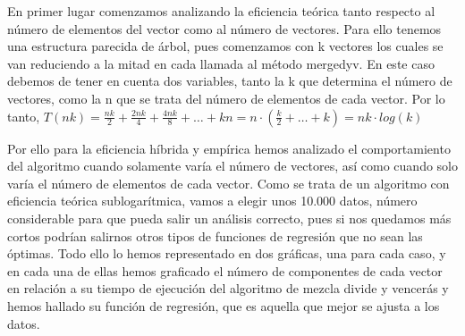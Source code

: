 En primer lugar comenzamos analizando la eficiencia teórica tanto respecto al número de elementos del vector como al número de vectores.
Para ello tenemos una estructura parecida de árbol, pues comenzamos con k vectores los cuales se van reduciendo a la mitad en cada llamada al método mergedyv.
En este caso debemos de tener en cuenta dos variables, tanto la k que determina el número de vectores, como la n que se trata del número de elementos de cada vector.
Por lo tanto, $T(nk) = \frac{nk}{2} + \frac{2nk}{4} + \frac{4nk}{8} + \dots + kn = n \cdot (\frac{k}{2} +\dots +k)= nk \cdot log(k) $

Por ello para la eficiencia híbrida y empírica hemos analizado el comportamiento del algoritmo cuando solamente varía el número de vectores, así como cuando solo varía el número de 
elementos de cada vector. 
Como se trata de un algoritmo con eficiencia teórica sublogarítmica, vamos a elegir unos 10.000 datos, número considerable para que pueda salir un análisis correcto, pues si nos quedamos más cortos
podrían salirnos otros tipos de funciones de regresión que no sean las óptimas.
Todo ello lo hemos representado en dos gráficas, una para cada caso, y en cada una de ellas hemos graficado el número de componentes de cada vector en relación a su tiempo de ejecución del algoritmo de mezcla
divide y vencerás y hemos hallado su función de regresión, que es aquella que mejor se ajusta a los datos.

